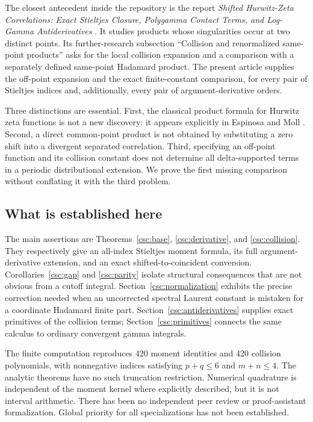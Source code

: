 \documentclass[11pt,a4paper]{article}
\numberwithin{equation}{section}
\theoremstyle{definition}
\begin{document}
The closest antecedent inside the repository is the report \emph{Shifted Hurwitz-Zeta Correlations: Exact Stieltjes Closure, Polygamma Contact Terms, and Log-Gamma Antiderivatives} \cite{csc:shifted}. It studies products whose singularities occur at two distinct points. Its further-research subsection ``Collision and renormalized same-point products'' asks for the local collision expansion and a comparison with a separately defined same-point Hadamard product. The present article supplies the off-point expansion and the exact finite-constant comparison, for every pair of Stieltjes indices and, additionally, every pair of argument-derivative orders.

Three distinctions are essential. First, the classical product formula for Hurwitz zeta functions is not a new discovery: it appears explicitly in Espinosa and Moll \cite[Theorem 3.1]{csc:EM}. Second, a direct common-point product is not obtained by substituting a zero shift into a divergent separated correlation. Third, specifying an off-point function and its collision constant does not determine all delta-supported terms in a periodic distributional extension. We prove the first missing comparison without conflating it with the third problem.

\subsection{What is established here}
The main assertions are Theorems~\ref{csc:base}, \ref{csc:derivative}, and \ref{csc:collision}. They respectively give an all-index Stieltjes moment formula, its full argument-derivative extension, and an exact shifted-to-coincident conversion. Corollaries~\ref{csc:gap} and \ref{csc:parity} isolate structural consequences that are not obvious from a cutoff integral. Section~\ref{csc:normalization} exhibits the precise correction needed when an uncorrected spectral Laurent constant is mistaken for a coordinate Hadamard finite part. Section~\ref{csc:antiderivatives} supplies exact primitives of the collision terms; Section~\ref{csc:primitives} connects the same calculus to ordinary convergent gamma integrals.

The finite computation reproduces 420 moment identities and 420 collision polynomials, with nonnegative indices satisfying $p+q\le6$ and $m+n\le4$. The analytic theorems have no such truncation restriction. Numerical quadrature is independent of the moment kernel where explicitly described, but it is not interval arithmetic. There has been no independent peer review or proof-assistant formalization. Global priority for all specializations has not been established.
\end{document}
